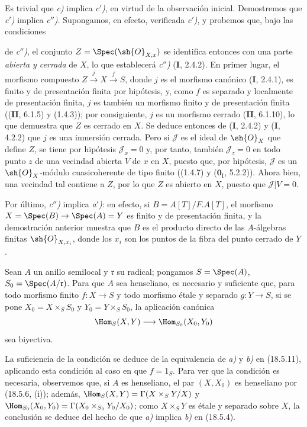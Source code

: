 Es trivial que \emph{c)} implica \emph{c$'$)}, en virtud de la observación inicial. Demostremos que \emph{c$'$)} implica \emph{c$''$)}. Supongamos, en efecto, verificada \emph{c$'$)}, y probemos que, bajo las condiciones


de \emph{c$''$)}, el conjunto $Z=\Spec(\sh{O}_{X,x})$ se identifica entonces con una parte \emph{abierta y cerrada} de $X$, lo que establecerá \emph{c$''$)} (\textbf I, 2.4.2). En primer lugar, el morfismo compuesto $Z\xrightarrow{j}X\xrightarrow{f}S$, donde $j$ es el morfismo canónico (\textbf I, 2.4.1), es finito y de presentación finita por hipótesis, y, como $f$ es separado y localmente de presentación finita, $j$ es también un morfismo finito y de presentación finita ((\textbf{II}, 6.1.5) y (1.4.3)); por consiguiente, $j$ es un morfismo cerrado (\textbf{II}, 6.1.10), lo que demuestra que $Z$ es cerrado en $X$. Se deduce entonces de (\textbf I, 2.4.2) y (\textbf I, 4.2.2) que $j$ es una inmersión cerrada. Pero si $\mathscr J$ es el ideal de $\sh{O}_X$ que define $Z$, se tiene por hipótesis $\mathscr J_x=0$ y, por tanto, también $\mathscr J_z=0$ en todo punto $z$ de una vecindad abierta $V$ de $x$ en $X$, puesto que, por hipótesis, $\mathscr J$ es un $\sh{O}_X$-módulo cuasicoherente de tipo finito ((1.4.7) y ($\mathbf 0_{\mathrm I}$, 5.2.2)). Ahora bien, una vecindad tal contiene a $Z$, por lo que $Z$ es abierto en $X$, puesto que $\mathscr J|V=0$.

Por último, \emph{c$''$)} implica \emph{a$'$)}: en efecto, si $B=A[T]/F.A[T]$, el morfismo $X=\Spec(B)\to\Spec(A)=Y$ es finito y de presentación finita, y la demostración anterior muestra que $B$ es el producto directo de las $A$-álgebras finitas $\sh{O}_{X,x_i}$, donde los $x_i$ son los puntos de la fibra del punto cerrado de $Y$.

\begin{corollary}[18.5.12]
\label{IV.18.5.12}
Sean $A$ un anillo semilocal y $\mathfrak r$ su radical; pongamos $S=\Spec(A)$, $S_0=\Spec(A/\mathfrak r)$. Para que $A$ sea henseliano, es necesario y suficiente que, para todo morfismo \textup{finito} $f:X\to S$ y todo morfismo \textup{étale y separado} $g:Y\to S$, si se pone $X_0=X\times_S S_0$ \textup{y} $Y_0=Y\times_S S_0$, la aplicación canónica
\[
  \Hom_S(X,Y)\longrightarrow\Hom_{S_0}(X_0,Y_0)
\]
sea biyectiva.
\end{corollary}

La suficiencia de la condición se deduce de la equivalencia de \emph{a)} y \emph{b)} en (18.5.11), aplicando esta condición al caso en que $f=1_S$. Para ver que la condición es necesaria, observemos que, si $A$ es henseliano, el par $(X,X_0)$ es henseliano por (18.5.6, (i)); además, $\Hom_S(X,Y)=\Gamma(X\times_S Y/X)$ y $\Hom_{S_0}(X_0,Y_0)=\Gamma(X_0\times_{S_0}Y_0/X_0)$; como $X\times_S Y$ es étale y separado sobre $X$, la conclusión se deduce del hecho de que \emph{a)} implica \emph{b)} en (18.5.4).

